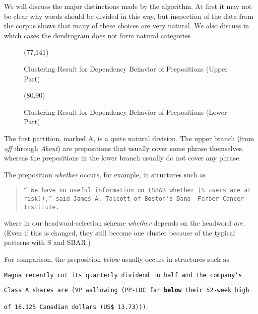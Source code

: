 We will discuss the major distinctions made by the algorithm. At first it may
not be clear why words should be divided in this way, but inspection of the data
from the corpus shows that many of these choices are very natural. We also
discuss in which cases the dendrogram does not form natural categories.

\begin{figure}[!thbm]
\begin{center}
\atari(77,141)
\caption{Clustering Result for Dependency Behavior of Prepositions (Upper Part)}
\label{dendro1}
\end{center}
\vspace*{1cm}
\end{figure}

\begin{figure}[!thbm]
\begin{center}
\atari(80,90)
\caption{Clustering Result for Dependency Behavior of Prepositions (Lower Part)}
\label{dendro2}
\end{center}
\end{figure}

The first partition, marked A, is a quite natural division. The upper
branch (from {\em off} through {\em About}) are prepositions that usually cover
some phrase themselves, whereas the prepositions in the lower branch usually
do not cover any phrase.

The preposition {\em whether} occurs, for example, in structures such as
\begin{quote}
{\tt `` We have no useful information on (SBAR {\bf whether} (S users 
are at \newline
risk)),'' said James A. Talcott of Boston's Dana- Farber Cancer \newline
Institute.}
\end{quote}
where in our headword-selection scheme {\em whether} depends on the headword
{\em are.} (Even if this is changed, they still become one cluster because of
the typical patterns with S and SBAR.)

For comparison, the preposition {\em below} usually occurs in structures such as

\hspace*{4mm}
{\tt Magna recently cut its quarterly dividend in half and the company's}

\hspace*{4mm}
{\tt Class A shares are (VP wallowing (PP-LOC far {\bf below} their 52-week high}

\hspace*{4mm}
{\tt of 16.125 Canadian dollars (US\$ 13.73)))}.

